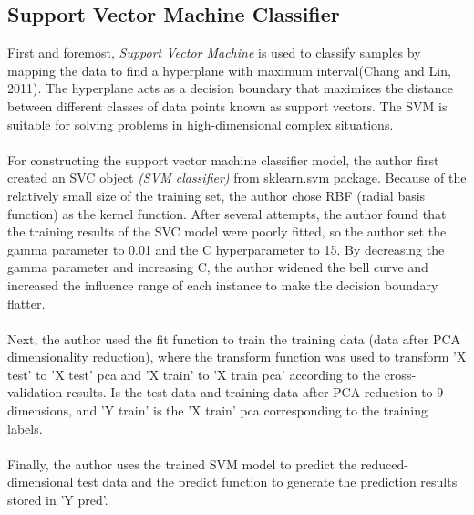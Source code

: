 \documentclass[10pt,twocolumn]{article}
\begin{document}
	\subsection{Support Vector Machine Classifier}
	First and foremost, \textit{Support Vector Machine} is used to classify samples by mapping the data to find a hyperplane with maximum interval(Chang and Lin, 2011). The hyperplane acts as a decision boundary that maximizes the distance between different classes of data points known as support vectors. The SVM is suitable for solving problems in high-dimensional complex situations.
	\\ \hspace*{\fill} \\
	For constructing the support vector machine classifier model, the author first created an SVC object \textit{(SVM classifier)} from sklearn.svm package. Because of the relatively small size of the training set, the author chose RBF (radial basis function) as the kernel function. After several attempts, the author found that the training results of the SVC model were poorly fitted, so the author set the gamma parameter to 0.01 and the C hyperparameter to 15. By decreasing the gamma parameter and increasing C, the author widened the bell curve and increased the influence range of each instance to make the decision boundary flatter.
	\\ \hspace*{\fill} \\
	Next, the author used the fit function to train the training data (data after PCA dimensionality reduction), where the transform function was used to transform 'X test' to 'X test' pca and 'X train' to 'X train pca' according to the cross-validation results. Is the test data and training data after PCA reduction to 9 dimensions, and 'Y train' is the 'X train' pca corresponding to the training labels.
	\\ \hspace*{\fill} \\
	Finally, the author uses the trained SVM model to predict the reduced-dimensional test data and the predict function to generate the prediction results stored in 'Y pred'.
	\\ \hspace*{\fill} \\
\end{document}

